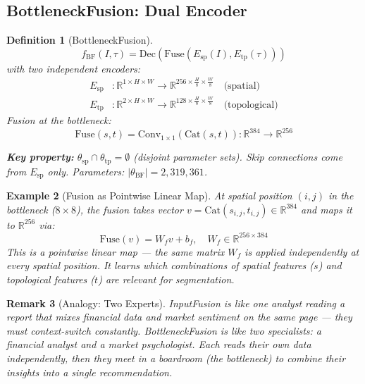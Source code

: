 \documentclass[10pt,twocolumn]{article}
\newtheorem{definition}{Definition}[section]
\newtheorem{remark}[definition]{Remark}
\newtheorem{example}[definition]{Example}
\begin{document}
\subsection{BottleneckFusion: Dual Encoder}

\begin{definition}[BottleneckFusion]\label{def:bf}
\begin{equation}
f_{\text{BF}}(I, \tau) = \text{Dec}(\text{Fuse}(E_{\text{sp}}(I), E_{\text{tp}}(\tau)))
\end{equation}
with two independent encoders:
\begin{align}
E_{\text{sp}} &: \mathbb{R}^{1 \times H \times W} \to \mathbb{R}^{256 \times \frac{H}{8} \times \frac{W}{8}} \quad \text{(spatial)} \\
E_{\text{tp}} &: \mathbb{R}^{2 \times H \times W} \to \mathbb{R}^{128 \times \frac{H}{8} \times \frac{W}{8}} \quad \text{(topological)}
\end{align}
Fusion at the bottleneck:
\begin{equation}
\text{Fuse}(s, t) = \text{Conv}_{1\times1}(\text{Cat}(s, t)): \mathbb{R}^{384} \to \mathbb{R}^{256}
\end{equation}

\textbf{Key property:} $\theta_{\text{sp}} \cap \theta_{\text{tp}} = \emptyset$ (disjoint parameter sets). Skip connections come from $E_{\text{sp}}$ only. Parameters: $|\theta_{\text{BF}}| = 2{,}319{,}361$.
\end{definition}

\begin{example}[Fusion as Pointwise Linear Map]\label{ex:fusion}
At spatial position $(i,j)$ in the bottleneck ($8\times8$), the fusion takes vector $v = \text{Cat}(s_{i,j}, t_{i,j}) \in \mathbb{R}^{384}$ and maps it to $\mathbb{R}^{256}$ via:
\begin{equation}
\text{Fuse}(v) = W_f v + b_f, \quad W_f \in \mathbb{R}^{256 \times 384}
\end{equation}
This is a \emph{pointwise} linear map --- the same matrix $W_f$ is applied independently at every spatial position. It learns which combinations of spatial features ($s$) and topological features ($t$) are relevant for segmentation.
\end{example}

\begin{remark}[Analogy: Two Experts]
InputFusion is like one analyst reading a report that mixes financial data and market sentiment on the same page --- they must context-switch constantly. BottleneckFusion is like two specialists: a financial analyst and a market psychologist. Each reads their own data independently, then they meet in a boardroom (the bottleneck) to combine their insights into a single recommendation.
\end{remark}
\end{document}
